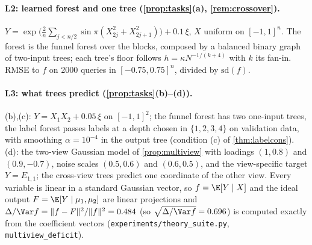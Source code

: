 \paragraph{L2: learned forest and one tree (\cref{prop:tasks}(a), \cref{rem:crossover}).}
$Y=\exp\bigl(\tfrac2n\sum_{j<n/2}\sin\pi(X_{2j}^2+X_{2j+1}^2)\bigr)+0.1\,\xi$, $X$ uniform on
$[-1,1]^n$.  The forest is the funnel forest over the blocks, composed by a balanced binary
graph of two-input trees; each tree's floor follows $h=\kappa N^{-1/(k+4)}$ with $k$ its
fan-in.  RMSE to $f$ on 2000 queries in $[-0.75,0.75]^n$, divided by $\mathrm{sd}(f)$.

\paragraph{L3: what trees predict (\cref{prop:tasks}(b)--(d)).}
(b),(c): $Y=X_1X_2+0.05\,\xi$ on $[-1,1]^2$; the funnel forest has two one-input trees, the
label forest passes labels at a depth chosen in $\{1,2,3,4\}$ on validation data, with
smoothing $\alpha=10^{-4}$ in the output tree (condition (c) of \cref{thm:labelcons}).  (d): the
two-view Gaussian model of \cref{prop:multiview} with loadings $(1,0.8)$ and $(0.9,-0.7)$,
noise scales $(0.5,0.6)$ and $(0.6,0.5)$, and the view-specific target $Y=E_{1,1}$; the
cross-view trees predict one coordinate of the other view.  Every variable is linear in a
standard Gaussian vector, so $f=\E[Y\mid X]$ and the ideal output $F=\E[Y\mid\mu_1,\mu_2]$
are linear projections and $\Delta/\Var f=\|f-F\|^2/\|f\|^2=0.484$ (so $\sqrt{\Delta/\Var f}=0.696$) is computed exactly from the
coefficient vectors (\texttt{experiments/theory\_suite.py}, \texttt{multiview\_deficit}).
